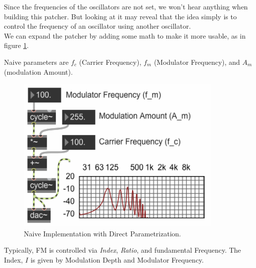 Since the frequencies of the oscillators are not set, we won't hear anything when building this patcher. But looking at it may reveal that the idea simply is to control the frequency of an oscillator using another oscillator.\\
We can expand the patcher by adding some math to make it more usable, as in figure \ref{fig:fmNaive}.

Naive parameters are ${f_c}$ (Carrier Frequency), ${f_m}$ (Modulator Frequency), and ${A_m}$ (modulation Amount).

\begin{figure}[H]
	\begin{center}
		\includegraphics[width = 10cm]{img/FMnaive.png}
		\caption{Naive Implementation with Direct Parametrization.}
		\label{fig:fmNaive}
	\end{center}
\end{figure}



Typically, FM is controlled via \textit{Index}, \textit{Ratio}, and fundamental Frequency.
The Index, ${I}$ is given by Modulation Depth and Modulator Frequency.




